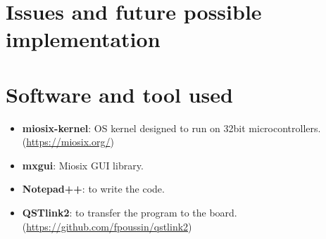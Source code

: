 \documentclass[18pt,oneside,a4paper, titlepage]{article}
\begin{document}
\newpage


\newpage
\section{Issues and future possible implementation}
	
\newpage
\section{Software and tool used}
	\begin{itemize}
		\item \textbf{miosix-kernel}: OS kernel designed to run on 32bit microcontrollers. (\url{https://miosix.org/})
		\item \textbf{mxgui}: Miosix GUI library.
		\item \textbf{Notepad++}: to write the code.
		\item \textbf{QSTlink2}: to transfer the program to the board. (\url{https://github.com/fpoussin/qstlink2})
	\end{itemize}
\end{document}
